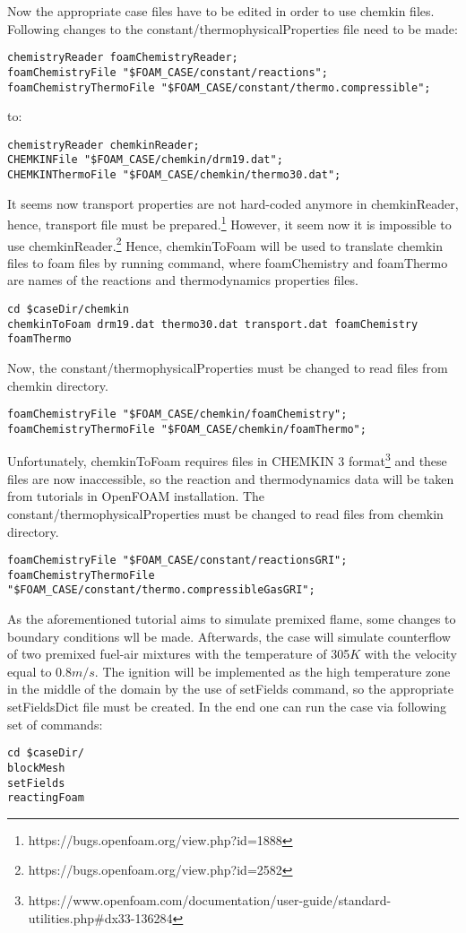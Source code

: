 \documentclass[12pt,english]{article}
\begin{document}
Now the appropriate case files have to be edited in order to use chemkin files. Following changes to the constant/thermophysicalProperties file need to be made:
\begin{lstlisting}
chemistryReader foamChemistryReader;
foamChemistryFile "$FOAM_CASE/constant/reactions";
foamChemistryThermoFile "$FOAM_CASE/constant/thermo.compressible";
\end{lstlisting}
to:
\begin{lstlisting}
chemistryReader chemkinReader;
CHEMKINFile "$FOAM_CASE/chemkin/drm19.dat";
CHEMKINThermoFile "$FOAM_CASE/chemkin/thermo30.dat";
\end{lstlisting}
It seems now transport properties are not hard-coded anymore in chemkinReader, hence, transport file must be prepared.\footnote{https://bugs.openfoam.org/view.php?id=1888} However, it seem now it is impossible to use chemkinReader.\footnote{https://bugs.openfoam.org/view.php?id=2582} Hence, chemkinToFoam will be used to translate chemkin files to foam files by running command, where foamChemistry and foamThermo are names of the reactions and thermodynamics properties files.
\begin{lstlisting}
cd $caseDir/chemkin
chemkinToFoam drm19.dat thermo30.dat transport.dat foamChemistry foamThermo
\end{lstlisting}
Now, the constant/thermophysicalProperties must be changed to read files from chemkin directory.
\begin{lstlisting}
foamChemistryFile "$FOAM_CASE/chemkin/foamChemistry";
foamChemistryThermoFile "$FOAM_CASE/chemkin/foamThermo";
\end{lstlisting}
Unfortunately, chemkinToFoam requires files in CHEMKIN 3 format\footnote{https://www.openfoam.com/documentation/user-guide/standard-utilities.php#dx33-136284} and these files are now inaccessible, so the reaction and thermodynamics data will be taken from tutorials in OpenFOAM installation.
The constant/thermophysicalProperties must be changed to read files from chemkin directory.
\begin{lstlisting}
foamChemistryFile "$FOAM_CASE/constant/reactionsGRI";
foamChemistryThermoFile "$FOAM_CASE/constant/thermo.compressibleGasGRI";
\end{lstlisting}

As the aforementioned tutorial aims to simulate premixed flame, some changes to boundary conditions wll be made. Afterwards, the case will simulate counterflow of two premixed fuel-air mixtures with the temperature of 305$K$ with the velocity equal to 0.8$m/s$. The ignition will be implemented as the high temperature zone in the middle of the domain by the use of setFields command, so the appropriate setFieldsDict file must be created.
In the end one can run the case via following set of commands:
\begin{lstlisting}
cd $caseDir/
blockMesh
setFields
reactingFoam
\end{lstlisting}
\end{document}
